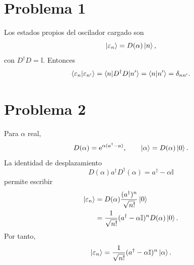 \documentclass[11pt,a4paper]{article}
\numberwithin{equation}{section}
\renewcommand{\boxed}[1]{#1}
\newcommand{\e}{\mathrm e}
\newcommand{\id}{\mathbb I}
\begin{document}
\section{Problema 1}
Los estados propios del oscilador cargado son
\begin{equation}
\ket{\varepsilon_n}=D(\alpha)\ket n,
\end{equation}
con $D^\dagger D=\id$. Entonces
\begin{equation}
\boxed{\braket{\varepsilon_n|\varepsilon_{n'}}
=\braket{n|D^\dagger D|n'}=\braket{n|n'}=\delta_{nn'}.}
\end{equation}

\section{Problema 2}
Para $\alpha$ real,
\begin{equation}
D(\alpha)=\e^{\alpha(a^\dagger-a)},\qquad
\ket\alpha=D(\alpha)\ket0.
\end{equation}
La identidad de desplazamiento
\begin{equation}
D(\alpha)a^\dagger D^\dagger(\alpha)=a^\dagger-\alpha\id
\end{equation}
permite escribir
\begin{align}
\ket{\varepsilon_n}
&=D(\alpha)\frac{(a^\dagger)^n}{\sqrt{n!}}\ket0\\
&=\frac1{\sqrt{n!}}(a^\dagger-\alpha\id)^nD(\alpha)\ket0.
\end{align}
Por tanto,
\begin{equation}
\boxed{\ket{\varepsilon_n}=\frac1{\sqrt{n!}}(a^\dagger-\alpha\id)^n\ket\alpha.}
\end{equation}
\end{document}
